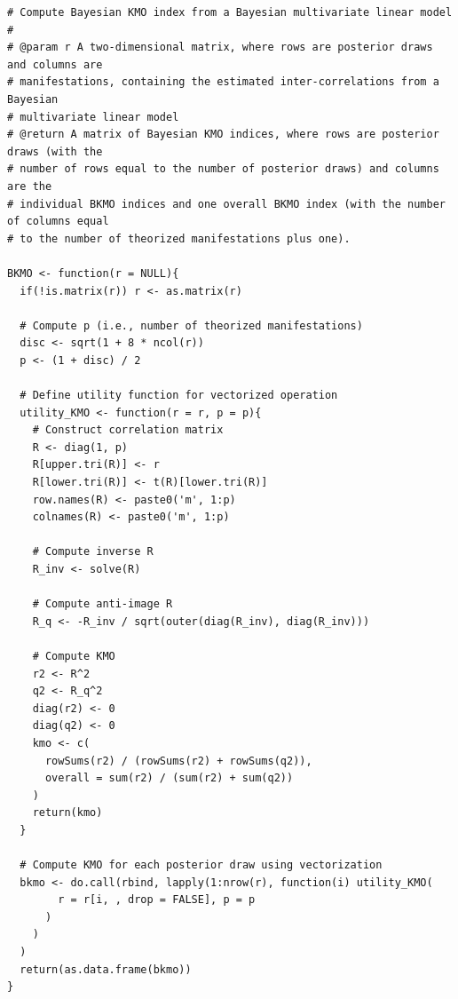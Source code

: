 \documentclass[
  10pt,
  a4paper,
  twoside]{article}
\begin{document}
\begin{verbatim}
# Compute Bayesian KMO index from a Bayesian multivariate linear model
#
# @param r A two-dimensional matrix, where rows are posterior draws and columns are
# manifestations, containing the estimated inter-correlations from a Bayesian
# multivariate linear model
# @return A matrix of Bayesian KMO indices, where rows are posterior draws (with the
# number of rows equal to the number of posterior draws) and columns are the
# individual BKMO indices and one overall BKMO index (with the number of columns equal
# to the number of theorized manifestations plus one).

BKMO <- function(r = NULL){
  if(!is.matrix(r)) r <- as.matrix(r)
  
  # Compute p (i.e., number of theorized manifestations)
  disc <- sqrt(1 + 8 * ncol(r))
  p <- (1 + disc) / 2
  
  # Define utility function for vectorized operation
  utility_KMO <- function(r = r, p = p){
    # Construct correlation matrix 
    R <- diag(1, p)
    R[upper.tri(R)] <- r
    R[lower.tri(R)] <- t(R)[lower.tri(R)]
    row.names(R) <- paste0('m', 1:p)
    colnames(R) <- paste0('m', 1:p)
    
    # Compute inverse R
    R_inv <- solve(R)
    
    # Compute anti-image R
    R_q <- -R_inv / sqrt(outer(diag(R_inv), diag(R_inv)))
    
    # Compute KMO
    r2 <- R^2
    q2 <- R_q^2
    diag(r2) <- 0
    diag(q2) <- 0
    kmo <- c(
      rowSums(r2) / (rowSums(r2) + rowSums(q2)),
      overall = sum(r2) / (sum(r2) + sum(q2))
    )
    return(kmo)
  }
  
  # Compute KMO for each posterior draw using vectorization
  bkmo <- do.call(rbind, lapply(1:nrow(r), function(i) utility_KMO(
        r = r[i, , drop = FALSE], p = p
      )
    )
  )
  return(as.data.frame(bkmo))
}
\end{verbatim}
\end{document}
